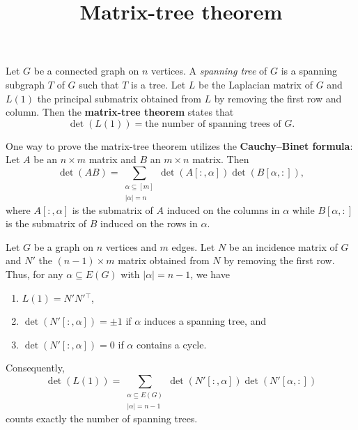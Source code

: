 \documentclass{article}
\title{Matrix-tree theorem}
\date{\vspace{-1cm}}
\newcommand{\trans}{^\top}
\theoremstyle{definition}
\begin{document}
\maketitle
\large

Let $G$ be a connected graph on $n$ vertices.  A \emph{spanning tree} of $G$ is a spanning subgraph $T$ of $G$ such that $T$ is a tree.  Let $L$ be the Laplacian matrix of $G$ and $L(1)$ the principal submatrix obtained from $L$ by removing the first row and column.  Then the \textbf{matrix-tree theorem} states that 
\[\det(L(1)) = \text{the number of spanning trees of $G$}.\]

One way to prove the matrix-tree theorem utilizes the \textbf{Cauchy--Binet formula}:  Let $A$ be an $n\times m$ matrix and $B$ an $m\times n$ matrix.  Then 
\[\det(AB) = \sum_{\substack{\alpha\subseteq[m]\\|\alpha| = n}}\det(A[:,\alpha])\det(B[\alpha,:]),\]
where $A[:,\alpha]$ is the submatrix of $A$ induced on the columns in $\alpha$ while $B[\alpha,:]$ is the submatrix of $B$ induced on the rows in $\alpha$.  

Let $G$ be a graph on $n$ vertices and $m$ edges.  Let $N$ be an incidence matrix of $G$ and $N'$ the $(n-1)\times m$ matrix obtained from $N$ by removing the first row.  Thus, for any $\alpha\subseteq E(G)$ with $|\alpha| = n-1$, we have 
\begin{enumerate}
\item $L(1) = N'N'{}\trans$, 
\item $\det(N'[:,\alpha]) = \pm 1$ if $\alpha$ induces a spanning tree, and 
\item $\det(N'[:,\alpha]) = 0$ if $\alpha$ contains a cycle.
\end{enumerate}
Consequently, 
\[\det(L(1)) = \sum_{\substack{\alpha\subseteq E(G)\\|\alpha| = n-1}}\det(N'[:,\alpha])\det(N'[\alpha,:])\]
counts exactly the number of spanning trees.
\end{document}
